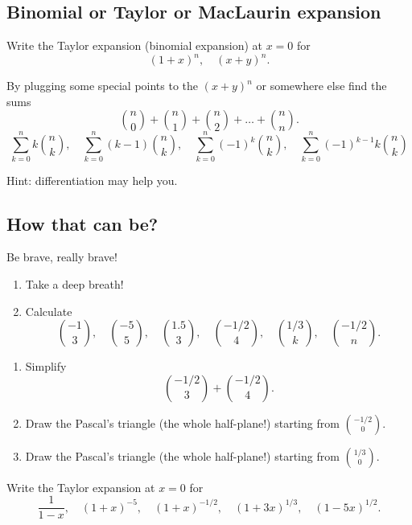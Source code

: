 \documentclass[12pt]{article}
\begin{document}
\subsection*{Binomial or Taylor or MacLaurin expansion}
\begin{exercise}
Write the Taylor expansion (binomial expansion) at $x = 0$ for 
\[
(1 + x)^{n}, \quad (x + y)^n.
\]
\end{exercise}


\begin{exercise}
By plugging some special points to the $(x + y)^n$ or somewhere else find the sums
\[
{n \choose 0} + {n \choose 1} + {n\choose 2} + \dots + {n \choose n}.
\]
\[
\sum_{k=0}^n k {n \choose k}, \quad \sum_{k=0}^n (k-1) {n \choose k}, \quad \sum_{k=0}^n (-1)^k {n \choose k}, \quad \sum_{k=0}^n (-1)^{k-1} k {n \choose k}
\]

Hint: differentiation may help you.
\end{exercise}


\subsection*{How that can be?}

\begin{exercise}
Be brave, really brave! 

\begin{enumerate}[label=\alph*)]
\item Take a deep breath! 
\item Calculate 
\[
{-1 \choose 3}, \quad {-5 \choose 5},\quad  {1.5 \choose 3}, \quad  
{-1/2 \choose 4}, \quad  {1/3 \choose k}, \quad  {-1/2 \choose n}. 
\]
\end{enumerate}
\end{exercise}

\begin{exercise}
\begin{enumerate}[label=\alph*)]
\item Simplify 
\[
{-1/2 \choose 3} + {-1/2 \choose 4}.
\]

\item Draw the Pascal's triangle (the whole half-plane!) starting from $-1/2 \choose 0$. 

\item Draw the Pascal's triangle (the whole half-plane!) starting from $1/3 \choose 0$. 
\end{enumerate}
\end{exercise}


\begin{exercise}
Write the Taylor expansion at $x = 0$ for 
\[
\frac{1}{1 - x}, \quad  (1 + x)^{-5}, \quad  (1 + x)^{-1/2}, \quad  
(1 + 3x)^{1/3}, \quad  (1 - 5x)^{1/2}.
\]
\end{exercise}
\end{document}
